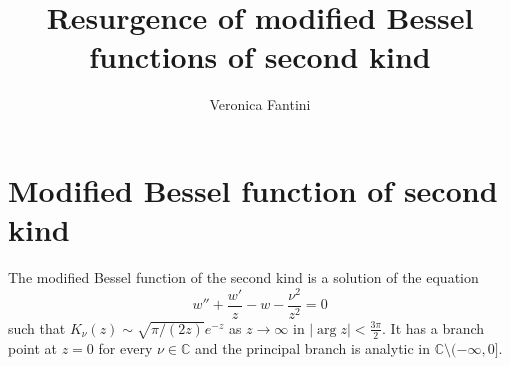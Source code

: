 \documentclass{article}
\title{Resurgence of modified Bessel functions of second kind}
\author{Veronica Fantini}
\newcommand{\C}{\mathbb{C}}
\begin{document}
\maketitle

\section{Modified Bessel function of second kind}

The modified Bessel function of the second kind is a solution of the equation
\begin{equation}\label{Bessel_nu}
w''+\frac{w'}{z}-w-\frac{\nu^2}{z^2}=0
\end{equation}
such that $K_{\nu}(z)\sim\sqrt{\pi/(2z)}e^{-z}$ as $z\to\infty$ in $|\arg z|<\frac{3\pi}{2}$. It has a branch point at $z=0$ for every $\nu\in\C$ and  the principal branch is analytic in $\C\setminus(-\infty,0]$. 
\end{document}
